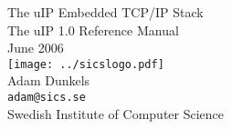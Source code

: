 \documentclass[a4paper]{book}
\begin{document}
\begin{titlepage}
\vspace*{5cm}
\begin{center}
{\Huge The uIP Embedded TCP/IP Stack}\\
\vspace*{1cm}
{\LARGE The uIP 1.0 Reference Manual}\\
\vspace*{3cm}
{\Large June 2006}\\
\vspace*{2cm}
\texttt{[image: ../sicslogo.pdf]}\\
\vspace*{1cm}
{\Large Adam Dunkels}\\
{\Large \texttt{adam@sics.se}}\\
\vspace*{1cm}
{\LARGE Swedish Institute of Computer Science}\\
\vspace*{0.5cm}

\end{center}
\end{titlepage}
\clearemptydoublepage
{}
\tableofcontents
\clearemptydoublepage
{}
\end{document}
